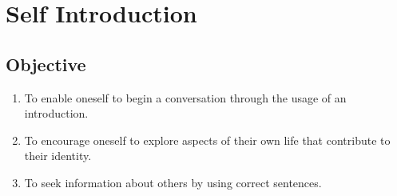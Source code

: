 \section{Self Introduction}

\subsection{Objective}

\begin{enumerate}
    \item To enable oneself to begin a conversation through the usage of an introduction.
    \item To encourage oneself to explore aspects of their own life that contribute to their identity.
    \item To seek information about others by using correct sentences.

\end{enumerate}